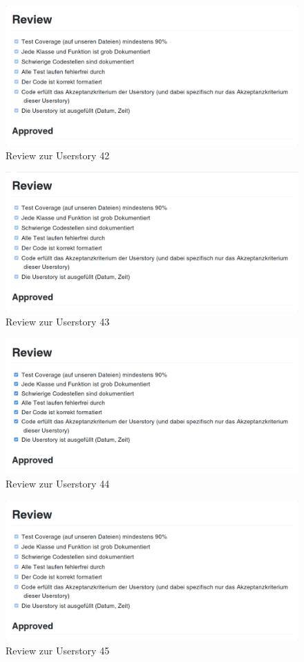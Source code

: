 \documentclass[accentcolor=tud9c,12pt,paper=a4]{tudreport}
\begin{document}
\begin{figure}[H]
\centering
\includegraphics[width=.8\textwidth]{code_review/us42}
\caption{Review zur Userstory 42}
\end{figure}

\begin{figure}[H]
\centering
\includegraphics[width=.8\textwidth]{code_review/us43}
\caption{Review zur Userstory 43}
\end{figure}

\begin{figure}[H]
\centering
\includegraphics[width=.8\textwidth]{code_review/us44}
\caption{Review zur Userstory 44}
\end{figure}

\begin{figure}[H]
\centering
\includegraphics[width=.8\textwidth]{code_review/us45}
\caption{Review zur Userstory 45}
\end{figure}
\end{document}
